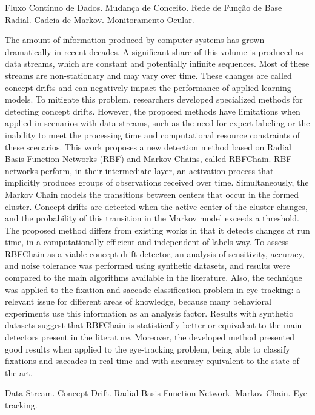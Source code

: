 \documentclass[msc, classic, a4paper]{ufbathesis}
\begin{document}
\begin{keywords}
    Fluxo Contínuo de Dados. Mudança de Conceito. Rede de Função de Base Radial. Cadeia de Markov. Monitoramento Ocular.
\end{keywords}

\abstract
The amount of information produced by computer systems has grown dramatically in recent decades.
A significant share of this volume is produced as data streams, which are constant and potentially infinite sequences.
Most of these streams are non-stationary and may vary over time.
These changes are called concept drifts and can negatively impact the performance of applied learning models.
To mitigate this problem, researchers developed specialized methods for detecting concept drifts.
However, the proposed methods have limitations when applied in scenarios with data streams,
such as the need for expert labeling or the inability to meet the processing time and computational resource constraints of these scenarios.
This work proposes a new detection method based on Radial Basis Function Networks (RBF) and Markov Chains, called RBFChain.
RBF networks perform, in their intermediate layer, an activation process that implicitly produces groups of observations received over time.
Simultaneously, the Markov Chain models the transitions between centers that occur in the formed cluster.
Concept drifts are detected when the active center of the cluster changes, and the probability of this transition in the Markov model exceeds a threshold.
The proposed method differs from existing works in that it detects changes at run time,  in a computationally efficient and independent of labels way.
To assess RBFChain as a viable concept drift detector, an analysis of sensitivity, accuracy, and noise tolerance was performed using synthetic datasets, and results were compared to the main algorithms available in the literature.
Also, the technique was applied to the fixation and saccade classification problem in eye-tracking: a relevant issue for different areas of knowledge, because many behavioral experiments use this information as an analysis factor.
Results with synthetic datasets suggest that RBFChain is statistically better or equivalent to the main detectors present in the literature.
Moreover, the developed method presented good results when applied to the eye-tracking problem, being able to classify fixations and saccades in real-time and with accuracy equivalent to the state of the art.

\begin{keywords}
   Data Stream. Concept Drift. Radial Basis Function Network. Markov Chain. Eye-tracking.
\end{keywords}
\end{document}
